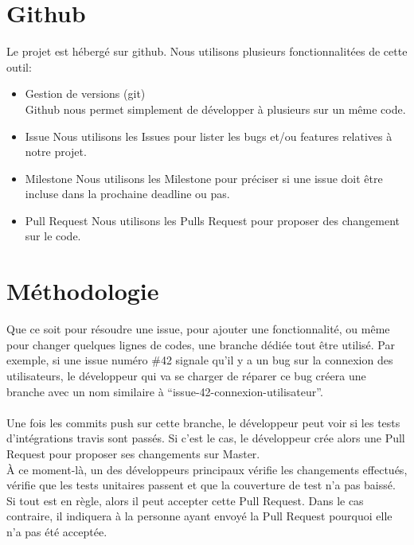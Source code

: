 \section{Github}
Le projet est hébergé sur github. Nous utilisons plusieurs fonctionnalitées de cette outil:
\begin{itemize}
\item Gestion de versions (git)\\
Github nous permet simplement de développer à plusieurs sur un même code.
\item Issue
Nous utilisons les Issues pour lister les bugs et/ou features relatives à notre projet.
\item Milestone
Nous utilisons les Milestone pour préciser si une issue doit être incluse dans la prochaine deadline ou pas.
\item Pull Request
Nous utilisons les Pulls Request pour proposer des changement sur le code.
\end{itemize}

\section{Méthodologie}
Que ce soit pour résoudre une issue, pour ajouter une fonctionnalité, ou même pour changer quelques lignes de codes, une branche dédiée tout être utilisé. Par exemple, si une issue numéro \#42 signale qu'il y a un bug sur la connexion des utilisateurs, le développeur qui va se charger de réparer ce bug créera une branche avec un nom similaire à ``issue-42-connexion-utilisateur''.\\
\\
Une fois les commits push sur cette branche, le développeur peut voir si les tests d'intégrations travis sont passés. Si c'est le cas, le développeur crée alors une Pull Request pour proposer ses changements sur Master.\\
À ce moment-là, un des développeurs principaux vérifie les changements effectués, vérifie que les tests unitaires passent et que la couverture de test n'a pas baissé. Si tout est en règle, alors il peut accepter cette Pull Request. Dans le cas contraire, il indiquera à la personne ayant envoyé la Pull Request pourquoi elle n'a pas été acceptée.